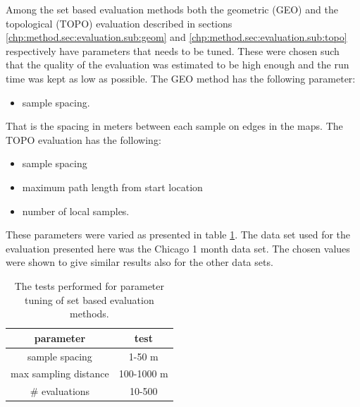 Among the set based evaluation methods both the geometric (GEO) and the topological (TOPO) evaluation described in sections \ref{chp:method.sec:evaluation.sub:geom} and \ref{chp:method.sec:evaluation.sub:topo} respectively have parameters that needs to be tuned. These were chosen such that the quality of the evaluation was estimated to be high enough and the run time was kept as low as possible. The GEO method has the following parameter:
\begin{itemize}
    \item sample spacing.
\end{itemize}
That is the spacing in meters between each sample on edges in the maps. The TOPO evaluation has the following:
\begin{itemize}
    \item sample spacing 
    \item maximum path length from start location
    \item number of local samples.
\end{itemize}
These parameters were varied as presented in table \ref{tab:experiments/paramtune}. The data set used for the evaluation presented here was the Chicago 1 month data set. The chosen values were shown to give similar results also for the other data sets.

\begin{table}[H]
\centering
\caption{The tests performed for parameter tuning of set based evaluation methods.}
\label{tab:experiments/paramtune}
\begin{tabular}{cc}
parameter & test \\ \hline
sample spacing & 1-50 m \\
max sampling distance & 100-1000 m \\
\# evaluations & 10-500 \\ \hline
\end{tabular}
\end{table}

